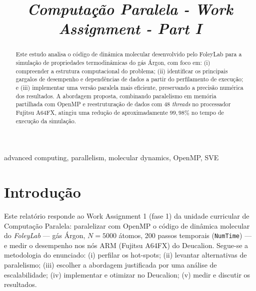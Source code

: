 \documentclass[conference]{IEEEtran}
\begin{document}
\title{\textit{Computação Paralela - Work Assignment - Part I}}

\author{
\and
{}
}

\maketitle

\begin{abstract}
Este estudo analisa o código de dinâmica molecular desenvolvido pelo FoleyLab para a simulação de propriedades termodinâmicas do gás Árgon, com foco em: (i) compreender a estrutura computacional do problema; (ii) identificar os principais gargalos de desempenho e dependências de dados a partir do perfilamento de execução; e (iii) implementar uma versão paralela mais eficiente, preservando a precisão numérica dos resultados. A abordagem proposta, combinando paralelismo em memória partilhada com OpenMP e reestruturação de dados com 48 \textit{threads} no processador Fujitsu A64FX, atingiu uma redução de aproximadamente $99{,}98\%$ no tempo de execução da simulação.
\end{abstract}

\begin{IEEEkeywords}
advanced computing, parallelism, molecular dynamics, OpenMP, SVE
\end{IEEEkeywords}

\section{Introdução}\label{INT}

Este relatório responde ao Work Assignment 1 (fase 1) da unidade curricular de Computação Paralela: paralelizar com OpenMP o código de dinâmica molecular do \textit{FoleyLab} --- gás Árgon, $N = 5000$ átomos, 200 passos temporais (\texttt{NumTime}) --- e medir o desempenho nos nós ARM (Fujitsu A64FX) do Deucalion. Segue-se a metodologia do enunciado: (i) perfilar os hot-spots; (ii) levantar alternativas de paralelismo; (iii) escolher a abordagem justificada por uma análise de escalabilidade; (iv) implementar e otimizar no Deucalion; (v) medir e discutir os resultados.
\end{document}
